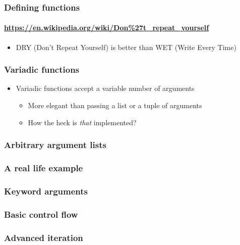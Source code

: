 \documentclass[9pt]{beamer}
\begin{document}
\begin{frame}
  \frametitle{Defining functions}
  \framesubtitle{\url{https://en.wikipedia.org/wiki/Don\%27t_repeat_yourself}}
  \begin{itemize}
  \item\alert{DRY (Don't Repeat Yourself) is better than WET (Write Every Time)}
  \end{itemize}

  \bigskip

  
\end{frame}


\begin{frame}
  \frametitle{Variadic functions}
  \begin{itemize}
  \item Variadic functions accept a variable number of arguments
    \begin{itemize}
    \item More elegant than passing a list or a tuple of arguments
    \item How the heck is \emph{that} implemented?
    \end{itemize}
  \end{itemize}

  \bigskip

  
\end{frame}


\begin{frame}
  \frametitle{Arbitrary argument lists}
  
\end{frame}


\begin{frame}
  \frametitle{A real life example}
  
\end{frame}


\begin{frame}
  \frametitle{Keyword arguments}
  

\end{frame}


\begin{frame}
  \frametitle{Basic control flow}
  
\end{frame}


\begin{frame}
  \frametitle{Advanced iteration}
  
\end{frame}
\end{document}
